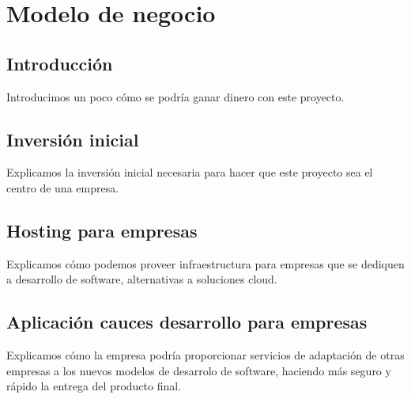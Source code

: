 \chapter {Modelo de negocio}

\section{Introducción}
	\begin{text}
		Introducimos un poco cómo se podría ganar dinero con este proyecto.
	\end{text}

\section{Inversión inicial}
	\begin{text}
		Explicamos la inversión inicial necesaria para hacer que este proyecto sea el centro de una empresa.
	\end{text}

\section{Hosting para empresas}
	\begin{text}
		Explicamos cómo podemos proveer infraestructura para empresas que se dediquen a desarrollo de software, alternativas a soluciones cloud.
	\end{text}

\section{Aplicación cauces desarrollo para empresas}
\begin{text}
	Explicamos cómo la empresa podría proporcionar servicios de adaptación de otras empresas a los nuevos modelos de desarrolo de software, haciendo más seguro y rápido la entrega del producto final.
\end{text}